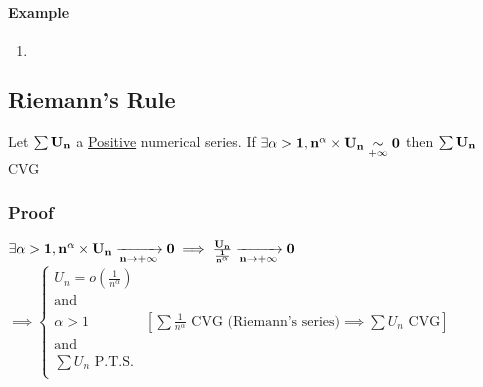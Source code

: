 \documentclass[notitlepage]{math}
\begin{document}
\paragraph{Example}
\begin{enumerate}
    \item  $\begin{array}{r}
        \end{array}$
        
\end{enumerate}
\subsection{Riemann's Rule}
Let $\bf \sum U_n$ a \underline{Positive} numerical series.
If $\bf \exists \alpha > 1 , n^\alpha \times U_n \underset{+\infty}{\sim} 0$ then $\bf \sum U_n$ CVG
\subsubsection{Proof}
$\bf \exists \alpha > 1, n^\alpha \times U_n \xrightarrow[n \to +\infty]{} 0 \implies \frac{U_n}{\frac{1}{n^\alpha}} \xrightarrow[n \to +\infty]{} 0$\\
$\implies \left\{ \begin{array}{r|r}
    U_n = o(\frac{1}{n^\alpha}) &\\
    \text{and } &\\ 
    \alpha > 1 & \left[ \sum \frac{1}{n^\alpha} \text{ CVG (Riemann's series)} \implies \sum U_n \text{ CVG} \right]\\
    \text{and } &\\
    \sum U_n \text{ P.T.S.}& \\
\end{array} \right. $
\end{document}
